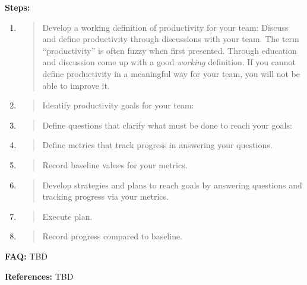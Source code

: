 \documentclass[]{article}
\begin{document}
\textbf{Steps:}

\begin{enumerate}
\def\labelenumi{\arabic{enumi}.}
\item
  \begin{quote}
  Develop a working definition of productivity for your team: Discuss
  and define productivity through discussions with your team. The term
  ``productivity'' is often fuzzy when first presented. Through
  education and discussion come up with a good \emph{working}
  definition. If you cannot define productivity in a meaningful way for
  your team, you will not be able to improve it.
  \end{quote}
\item
  \begin{quote}
  Identify productivity goals for your team:
  \end{quote}
\item
  \begin{quote}
  Define questions that clarify what must be done to reach your goals:
  \end{quote}
\item
  \begin{quote}
  Define metrics that track progress in answering your questions.
  \end{quote}
\item
  \begin{quote}
  Record baseline values for your metrics.
  \end{quote}
\item
  \begin{quote}
  Develop strategies and plans to reach goals by answering questions and
  tracking progress via your metrics.
  \end{quote}
\item
  \begin{quote}
  Execute plan.
  \end{quote}
\item
  \begin{quote}
  Record progress compared to baseline.
  \end{quote}
\end{enumerate}

\textbf{FAQ:} TBD

\protect\hypertarget{h.gjdgxs}{}{}\textbf{References:} TBD
\end{document}
